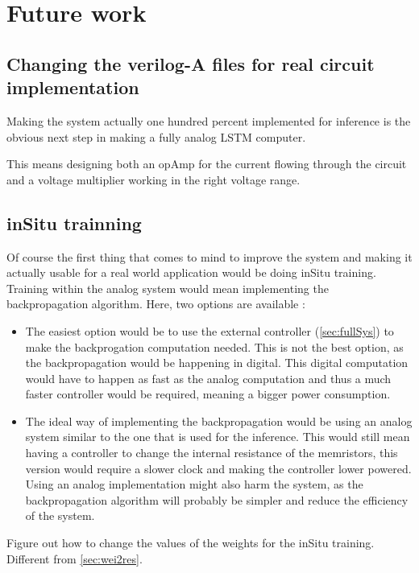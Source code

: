 \section{Future work}\label{sec:further}

\subsection{Changing the verilog-A files for real circuit implementation}

Making the system actually one hundred percent implemented for inference is the obvious next step in making a fully analog \ac{LSTM} computer.

This means designing both an \ac{opAmp} for the current flowing through the circuit and a voltage multiplier working in the right voltage range.

\subsection{inSitu trainning}

Of course the first thing that comes to mind to improve the system and making it actually usable for a real world application would be doing inSitu training. Training within the analog system would mean implementing the backpropagation algorithm. Here, two options are available :

\begin{itemize}
\item The easiest option would be to use the external controller (\cref{sec:fullSys}) to make the backprogation computation needed. This is not the best option, as the backpropagation would be happening in digital. This digital computation would have to happen as fast as the analog computation and thus a much faster controller would be required, meaning a bigger power consumption.
\item The ideal way of implementing the backpropagation would be using an analog system similar to the one that is used for the inference. This would still mean having a controller to change the internal resistance of the memristors, this version would require a slower clock and making the controller lower powered. Using an analog implementation might also harm the system, as the backpropagation algorithm will probably be simpler and reduce the efficiency of the system.
\end{itemize}

Figure out how to change the values of the weights for the inSitu training. Different from \cref{sec:wei2res}.

